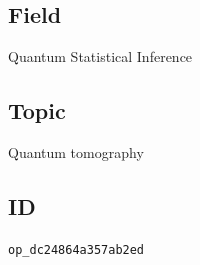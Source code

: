 \subsection*{Field}

Quantum Statistical Inference

\subsection*{Topic}

Quantum tomography

\subsection*{ID}

\texttt{op\_dc24864a357ab2ed}

